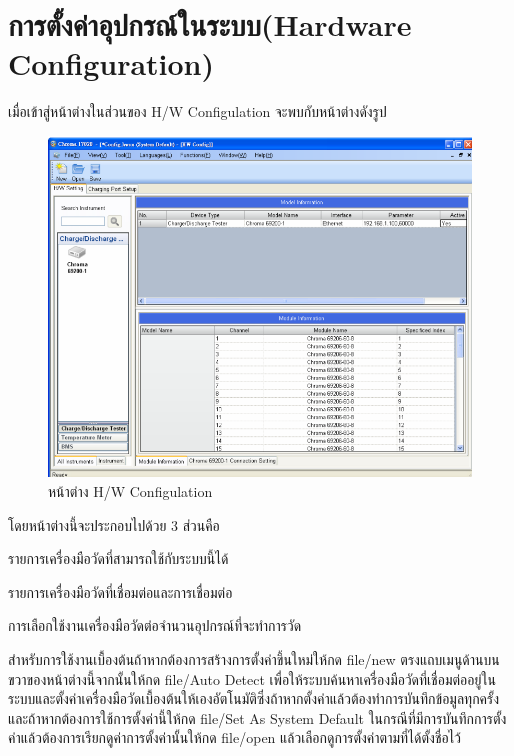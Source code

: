 \section{การตั้งค่าอุปกรณ์ในระบบ(Hardware Configuration)}
เมื่อเข้าสู่หน้าต่างในส่วนของ H/W Configulation จะพบกับหน้าต่างดังรูป
\begin{center}
	\begin{figure}[H]
		\includegraphics[width=1\linewidth]{Chapters/img/17020_Program/HW_Configulation/Main.png}
		\centering
		\captionsetup{justification=centering,margin=2cm}
		\caption{หน้าต่าง H/W Configulation}
	\end{figure}
\end{center}
โดยหน้าต่างนี้จะประกอบไปด้วย 3 ส่วนคือ
\begin{itemize}
{\item รายการเครื่องมือวัดที่สามารถใช้กับระบบนี้ได้}
{\item รายการเครื่องมือวัดที่เชื่อมต่อและการเชื่อมต่อ}
{\item การเลือกใช้งานเครื่องมือวัดต่อจำนวนอุปกรณ์ที่จะทำการวัด}
\end{itemize}
สำหรับการใช้งานเบื้องต้นถ้าหากต้องการสร้างการตั้งค่าขึ้นใหม่ให้กด file/new ตรงแถบเมนูด้านบนขวาของหน้าต่างนี้จากนั้นให้กด file/Auto Detect เพื่อให้ระบบค้นหาเครื่องมือวัดที่เชื่อมต่ออยู่ในระบบและตั้งค่าเครื่องมือวัดเบื้องต้นให้เองอัตโนมัติซึ่งถ้าหากตั้งค่าแล้วต้องทำการบันทึกข้อมูลทุกครั้งและถ้าหากต้องการใช้การตั้งค่านี้ให้กด file/Set As System Default
ในกรณีที่มีการบันทึกการตั้งค่าแล้วต้องการเรียกดูค่าการตั้งค่านั้นให้กด file/open แล้วเลือกดูการตั้งค่าตามที่ได้ตั้งชื่อไว้

